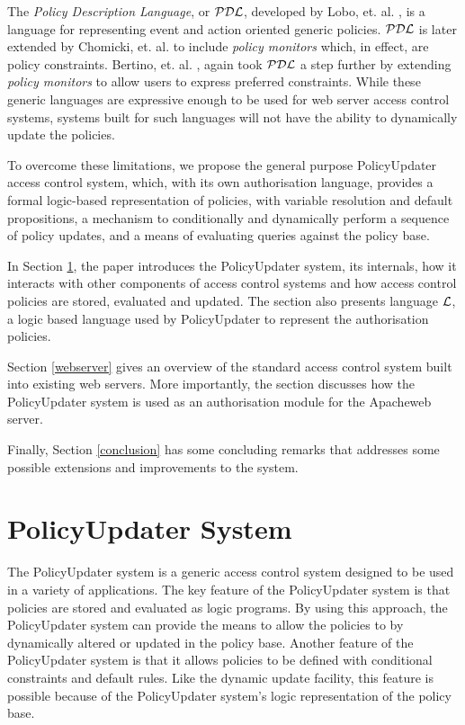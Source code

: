 \documentclass[11pt]{llncs}
\begin{document}
    The {\em Policy Description Language}, or ${\cal PDL}$, developed by Lobo,
    et. al. \cite{LOB}, is a language for representing event and action
    oriented generic policies. ${\cal PDL}$ is later extended by Chomicki, et.
    al. \cite{CHO} to include {\em policy monitors} which, in effect, are
    policy constraints. Bertino, et. al. \cite{BE2}, again took ${\cal PDL}$ a
    step further by extending {\em policy monitors} to allow users to express
    preferred constraints. While these generic languages are expressive enough
    to be used for web server access control systems, systems built for such
    languages will not have the ability to dynamically update the policies.

    To overcome these limitations, we propose the general purpose PolicyUpdater
    access control system, which, with its own authorisation language,
    provides a formal logic-based representation of policies, with variable
    resolution and default propositions, a mechanism to conditionally and
    dynamically perform a sequence of policy updates, and a means of evaluating
    queries against the policy base.

    In Section \ref{polupdate}, the paper introduces the PolicyUpdater system,
    its internals, how it interacts with other components of access control
    systems and how access control policies are stored, evaluated and updated.
    The section also presents language ${\cal L}$, a logic based language used
    by PolicyUpdater to represent the authorisation policies.

    Section \ref{webserver} gives an overview of the standard access control
    system built into existing web servers. More importantly, the section
    discusses how the PolicyUpdater system is used as an authorisation module
    for the Apache\footnotemark web server.


    Finally, Section \ref{conclusion} has some concluding remarks that
    addresses some possible extensions and improvements to the system.

  \section{PolicyUpdater System}
    \label{polupdate}

    The PolicyUpdater system is a generic access control system designed to
    be used in a variety of applications. The key feature of the PolicyUpdater
    system is that policies are stored and evaluated as logic programs. By
    using this approach, the PolicyUpdater system can provide the means to
    allow the policies to by dynamically altered or updated in the policy
    base. Another feature of the PolicyUpdater system is that it allows
    policies to be defined with conditional constraints and default rules. Like
    the dynamic update facility, this feature is possible because of the
    PolicyUpdater system's logic representation of the policy base.
\end{document}
